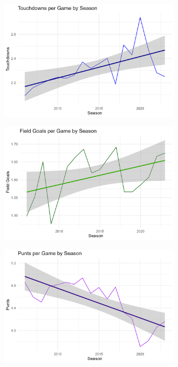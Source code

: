 \documentclass{article}
\begin{document}
\begin{figure}[ht]
    \centering
    \begin{subfigure}{0.32\textwidth}
        \centering
        \includegraphics[width=\textwidth]{../plots/td_per_game.png}
    \end{subfigure}\hfill
    \begin{subfigure}{0.32\textwidth}
        \centering
        \includegraphics[width=\textwidth]{../plots/fg_per_game.png}
    \end{subfigure}\hfill
    \begin{subfigure}{0.32\textwidth}
        \centering
        \includegraphics[width=\textwidth]{../plots/punt_per_game.png}

\end{subfigure}
\end{figure}
\end{document}
